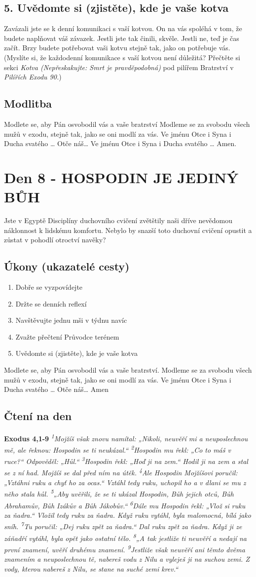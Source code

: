 \documentclass[11pt]{article}
\newcommand{\zacatekDruhyTyden}{
  Jste v Egyptě \newline
  Disciplíny duchovního cvičení zvětštily naši dříve nevědomou náklonnost k lidskému komfortu.
  Nebylo by snazší toto duchovní cvičení opustit a zůstat v pohodlí otroctví navěky?

  \subsection*{Úkony (ukazatelé cesty)}
\begin{enumerate}
  \item Dobře se vyzpovídejte
  \item Držte se denních reflexí
  \item Navštěvujte jednu mši v týdnu navíc
  \item Zvažte přečtení Průvodce terénem
  \item Uvědomte si (zjistěte), kde je vaše kotva
\end{enumerate}
Modlete se, aby Pán osvobodil vás a vaše bratrství. \newline
Modleme se za svobodu všech mužů v exodu, stejně tak, jako se oni modlí za vás.\newline
Ve jménu Otce i Syna i Ducha svatého …  Otče náš… Amen
}
\begin{document}
\subsection*{5. Uvědomte si (zjistěte), kde je vaše kotva}
Zavázali jste se k denní komunikaci s vaší kotvou. On na vás spoléhá v tom, že budete naplňovat váš závazek. Jestli jste tak činili, skvěle. Jestli ne, teď je čas začít. Brzy budete potřebovat vaši kotvu stejně tak, jako on potřebuje vás. (Myslíte si, že každodenní komunikace s vaší kotvou není důležitá? Přečtěte si sekci \textit{Kotva (Nepřeskakujte: Smrt je pravděpodobná)} pod pilířem Bratrství v \textit{Pilířích Exodu 90.})

\subsection*{Modlitba}
Modlete se, aby Pán osvobodil vás a vaše bratrství \newline
Modleme se za svobodu všech mužů v exodu, stejně tak, jako se oni modlí za vás.\newline
Ve jménu Otce i Syna i Ducha svatého … Otče náš… Ve jménu Otce i Syna i Ducha svatého … Amen.

\newpage
\section{Den 8 - HOSPODIN JE JEDINÝ BŮH}
\zacatekDruhyTyden
\subsection*{Čtení na den}
\textbf{Exodus 4,1-9}
\newline
\textit{
\textsuperscript{1}Mojžíš však znovu namítal: „Nikoli, neuvěří mi a neuposlechnou mě, ale řeknou: Hospodin se ti neukázal.“
\textsuperscript{2}Hospodin mu řekl: „Co to máš v ruce?“ Odpověděl: „Hůl.“
\textsuperscript{3}Hospodin řekl: „Hoď ji na zem.“ Hodil ji na zem a stal se z ní had. Mojžíš se dal před ním na útěk.
\textsuperscript{4}Ale Hospodin Mojžíšovi poručil: „Vztáhni ruku a chyť ho za ocas.“ Vztáhl tedy ruku, uchopil ho a v dlani se mu z něho stala hůl.
\textsuperscript{5}„Aby uvěřili, že se ti ukázal Hospodin, Bůh jejich otců, Bůh Abrahamův, Bůh Izákův a Bůh Jákobův.“
\textsuperscript{6}Dále mu Hospodin řekl: „Vlož si ruku za ňadra.“ Vložil tedy ruku za ňadra. Když ruku vytáhl, byla malomocná, bílá jako sníh.
\textsuperscript{7}Tu poručil: „Dej ruku zpět za ňadra.“ Dal ruku zpět za ňadra. Když ji ze záňadří vytáhl, byla opět jako ostatní tělo.
\textsuperscript{8}„A tak jestliže ti neuvěří a nedají na první znamení, uvěří druhému znamení.
\textsuperscript{9}Jestliže však neuvěří ani těmto dvěma znamením a neuposlechnou tě, nabereš vodu z Nilu a vyleješ ji na suchou zemi. Z vody, kterou nabereš z Nilu, se stane na suché zemi krev.“
}
\end{document}
